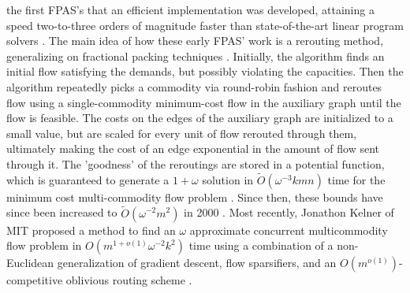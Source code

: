 the first FPAS's that an efficient implementation was developed,
attaining a speed two-to-three orders of magnitude faster than
state-of-the-art linear program solvers \cite{goldberg}.
The main idea of how
these early FPAS' work is a rerouting method, generalizing on
fractional packing techniques \cite{karger}.
Initially, the
algorithm finds an initial flow satisfying the demands, but possibly
violating the capacities. Then the algorithm repeatedly
picks a commodity via round-robin fashion and reroutes flow using a
single-commodity minimum-cost flow in the auxiliary graph until the flow is feasible. The costs
on the edges of the auxiliary graph are initialized to a small value,
but are scaled for every unit of flow rerouted through them, ultimately
making the cost of an edge exponential in the amount of flow sent
through it. The 'goodness' of the reroutings are stored in a potential function, which
is guaranteed to generate a $1+\omega$ solution in
$\tilde{O}(\omega^{-3}kmn)$ time for the minimum cost multi-commodity flow
problem \cite{karger}. 
Since then, these bounds have since been increased to
$\tilde{O}(\omega^{-2}m^2)$ in 2000 \cite{grig}. 
Most recently, Jonathon Kelner of MIT proposed a method to find an $\omega$ approximate concurrent multicommodity flow problem
in  $O(m^{1+o(1)}\omega^{-2}k^2)$ time
using a combination of a
non-Euclidean generalization of gradient descent, flow sparsifiers,
and an $O(m^{o(1)})$-competitive oblivious routing scheme \cite{almostLinear}. 

